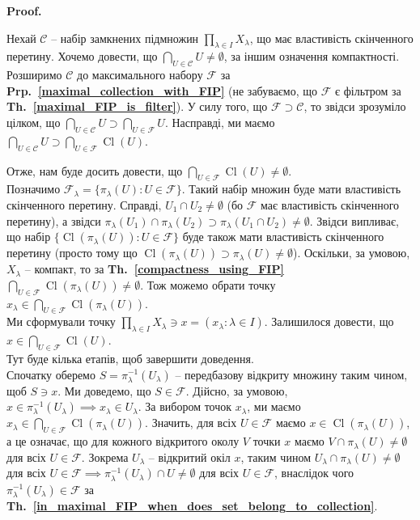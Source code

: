 \documentclass[a4paper, 10pt]{article}
\makeatletter
\theoremstyle{theoremdd}
\newcommand\thref[1]{\textbf{Th.~\ref{#1}}}
\newcommand\prpref[1]{\textbf{Prp.~\ref{#1}}}
\DeclareMathOperator{\Cl}{Cl}
\renewenvironment{proof}[1][Proof.\\]{\par
\pushQED{\hfill \qed}%
\normalfont \topsep6\p@\@plus6\p@\relax
\trivlist
\item\relax
{\bfseries
#1\@addpunct{.}}\hspace\labelsep\ignorespaces
}{%
\popQED\endtrivlist\@endpefalse
}
\makeatother
\begin{document}
\begin{proof}
Нехай $\mathcal{C}$ -- набір замкнених підмножин $\displaystyle\prod_{\lambda \in I} X_\lambda$, що має властивість скінченного перетину. Хочемо довести, що $\displaystyle\bigcap_{U \in \mathcal{C}} U \neq \emptyset$, за іншим означення компактності.\\
Розширимо $\mathcal{C}$ до максимального набору $\mathcal{F}$ за \prpref{maximal_collection_with_FIP} (не забуваємо, що $\mathcal{F}$ є фільтром за \thref{maximal_FIP_is_filter}). У силу того, що $\mathcal{F} \supset \mathcal{C}$, то звідси зрозуміло цілком, що $\displaystyle\bigcap_{U \in \mathcal{C}} U \supset \bigcap_{U \in \mathcal{F}} U$. Насправді, ми маємо $\displaystyle\bigcap_{U \in \mathcal{C}} U \supset \bigcap_{U \in \mathcal{F}} \Cl(U)$.
\iffalse
Дійсно, $\displaystyle\bigcap_{U \in \mathcal{F}} \Cl U = \bigcap_{U \in \mathcal{F} \setminus \mathcal{C}} \Cl U \cap \bigcap_{U \in \mathcal{C}} \Cl U \subset \bigcap_{U \in \mathcal{C}} \Cl U = \bigcap_{U \in \mathcal{C}} U$.
\fi
Отже, нам буде досить довести, що $\displaystyle\bigcap_{U \in \mathcal{F}} \Cl(U) \neq \emptyset$.\\
Позначимо $\mathcal{F}_\lambda = \{ \pi_\lambda(U) : U \in \mathcal{F} \}$. Такий набір множин буде мати властивість скінченного перетину. Справді, $U_1 \cap U_2 \neq \emptyset$ (бо $\mathcal{F}$ має властивість скінченного перетину), а звідси $\pi_\lambda(U_1) \cap \pi_\lambda(U_2) \supset \pi_\lambda(U_1 \cap U_2) \neq \emptyset$. Звідси випливає, що набір $\{\Cl(\pi_\lambda(U)) : U \in \mathcal{F}\}$ буде також мати властивість скінченного перетину (просто тому що $\Cl(\pi_\lambda(U)) \supset \pi_\lambda(U) \neq \emptyset$). Оскільки, за умовою, $X_\lambda$ -- компакт, то за \thref{compactness_using_FIP} $\displaystyle\bigcap_{U \in \mathcal{F}} \Cl(\pi_\lambda(U)) \neq \emptyset$. Тож можемо обрати точку $x_\lambda \in \displaystyle\bigcap_{U \in \mathcal{F}} \Cl(\pi_\lambda(U))$.\\
Ми сформували точку $\displaystyle\prod_{\lambda \in I} X_\lambda \ni x = (x_\lambda : \lambda \in I)$. Залишилося довести, що $x \in \displaystyle\bigcap_{U \in \mathcal{F}} \Cl (U)$.\\
Тут буде кілька етапів, щоб завершити доведення.\\
Спочатку оберемо $S = \pi_\lambda^{-1}(U_\lambda)$ -- передбазову відкриту множину таким чином, щоб $S \ni x$. Ми доведемо, що $S \in \mathcal{F}$. Дійсно, за умовою, $x \in \pi_\lambda^{-1}(U_\lambda) \implies x_\lambda \in U_\lambda$. За вибором точок $x_\lambda$, ми маємо $x_\lambda \in \displaystyle\bigcap_{U \in \mathcal{F}} \Cl(\pi_\lambda(U))$. Значить, для всіх $U \in \mathcal{F}$ маємо $x \in \Cl(\pi_\lambda(U))$, а це означає, що для кожного відкритого околу $V$ точки $x$ маємо $V \cap \pi_\lambda(U) \neq \emptyset$ для всіх $U \in \mathcal{F}$. Зокрема $U_\lambda$ -- відкритий окіл $x$, таким чином $U_\lambda \cap \pi_\lambda(U) \neq \emptyset$ для всіх $U \in \mathcal{F} \implies \pi_\lambda^{-1}(U_\lambda) \cap U \neq \emptyset$ для всіх $U \in \mathcal{F}$, внаслідок чого $\pi_\lambda^{-1}(U_\lambda) \in \mathcal{F}$ за \thref{in_maximal_FIP_when_does_set_belong_to_collection}.\\

\end{proof}
\end{document}

